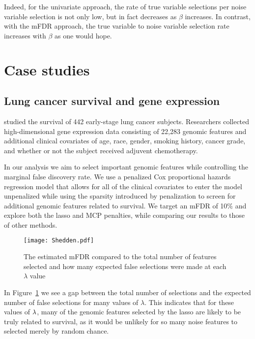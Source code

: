 Indeed, for the univariate approach, the rate of true variable selections per noise variable selection is not only low, but in fact decreases as $\beta$ increases. In contrast, with the mFDR approach, the true variable to noise variable selection rate increases with $\beta$ as one would hope.

\section{Case studies}

\subsection{Lung cancer survival and gene expression}

\citet{Shedden2008} studied the survival of 442 early-stage lung cancer subjects. Researchers collected high-dimensional gene expression data consisting of 22,283 genomic features and additional clinical covariates of age, race, gender, smoking history, cancer grade, and whether or not the subject received adjuvent chemotherapy.  

In our analysis we aim to select important genomic features while controlling the marginal false discovery rate.  We use a penalized Cox proportional hazards regression model that allows for all of the clinical covariates to enter the model unpenalized while using the sparsity introduced by penalization to screen for additional genomic features related to survival.  We target an mFDR of 10\% and explore both the lasso and MCP penalties, while comparing our results to those of other methods.


\begin{figure} [!htb]
 \centering
  \texttt{[image: Shedden.pdf]}
  \caption{\label{Fig:Shedden} The estimated mFDR compared to the total number of features selected and how many expected false selections were made at each $\lambda$ value}
\end{figure}

In Figure~\ref{Fig:Shedden} we see a gap between the total number of selections and the expected number of false selections for many values of $\lambda$.  This indicates that for these values of $\lambda$, many of the genomic features selected by the lasso are likely to be truly related to survival, as it would be unlikely for so many noise features to selected merely by random chance.

